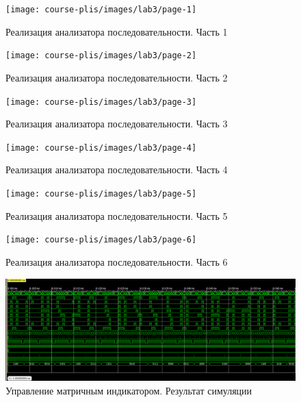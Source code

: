 \begin{figure}[h!]
	\centering
	\texttt{[image: course-plis/images/lab3/page-1]}
	\caption{Реализация анализатора последовательности. Часть 1}
	\label{fig:3page-1}
\end{figure}
\begin{figure}[h!]
	\texttt{[image: course-plis/images/lab3/page-2]}
\caption{Реализация анализатора последовательности. Часть 2}
	\label{fig:3page-2}
\end{figure}
\begin{figure}[h!]
	\centering
	\texttt{[image: course-plis/images/lab3/page-3]}
	\caption{Реализация анализатора последовательности. Часть 3}
	\label{fig:3page-3}
\end{figure}
\begin{figure}[h!]
	\centering
	\texttt{[image: course-plis/images/lab3/page-4]}
	\caption{Реализация анализатора последовательности. Часть 4}
	\label{fig:3page-4}
\end{figure}
\begin{figure}[h!]
	\centering
	\texttt{[image: course-plis/images/lab3/page-5]}
	\caption{Реализация анализатора последовательности. Часть 5}
	\label{fig:3page-5}
\end{figure}
\begin{figure}[h!]
	\centering
	\texttt{[image: course-plis/images/lab3/page-6]}
	\caption{Реализация анализатора последовательности. Часть 6}
	\label{fig:3page-6}
\end{figure}



\begin{figure}[h!]
	\centering
	\includegraphics[width=1\linewidth]{course-plis/images/lab4/4isim}
	\caption{Управление матричным индикатором. Результат симуляции}
	\label{fig:4isim}
\end{figure}



